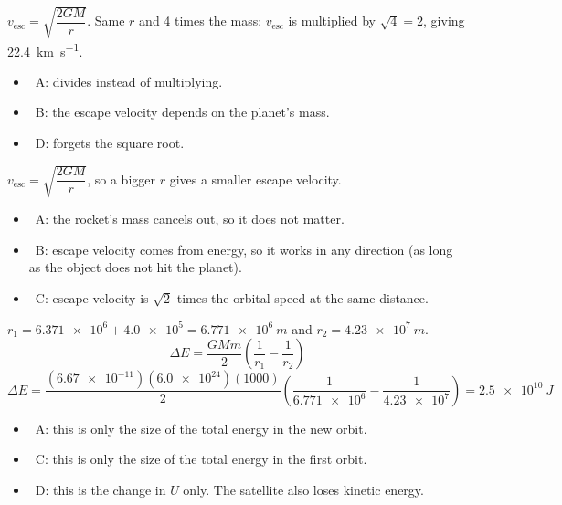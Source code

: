 \documentclass[12pt]{article}
\begin{document}
\begin{practiceanswers}
\begin{practiceans}
  $v_\mathrm{esc} = \sqrt{\dfrac{2GM}{r}}$. Same $r$ and 4 times the mass: $v_\mathrm{esc}$ is
  multiplied by $\sqrt{4} = 2$, giving \qty{22.4}{km.s^{-1}}.
  \begin{itemize}
    \item \xmark\ A: divides instead of multiplying.
    \item \xmark\ B: the escape velocity depends on the planet's mass.
    \item \xmark\ D: forgets the square root.
  \end{itemize}
\end{practiceans}

\begin{practiceans}
  $v_\mathrm{esc} = \sqrt{\dfrac{2GM}{r}}$, so a bigger $r$ gives a smaller escape velocity.
  \begin{itemize}
    \item \xmark\ A: the rocket's mass cancels out, so it does not matter.
    \item \xmark\ B: escape velocity comes from energy, so it works in any direction (as long as the
          object does not hit the planet).
    \item \xmark\ C: escape velocity is $\sqrt{2}$ times the orbital speed at the same distance.
  \end{itemize}
\end{practiceans}

\begin{practiceans}
  $r_1 = \num{6.371e6} + \num{4.0e5} = \qty{6.771e6}{m}$ and $r_2 = \qty{4.23e7}{m}$.
  \[ \Delta E = \frac{GMm}{2}\left(\frac{1}{r_1} - \frac{1}{r_2}\right) \]
  \[ \Delta E = \frac{(\num{6.67e-11})(\num{6.0e24})(1000)}{2}\left(\frac{1}{\num{6.771e6}} - \frac{1}{\num{4.23e7}}\right)
     = \qty{2.5e10}{J} \]
  \begin{itemize}
    \item \xmark\ A: this is only the size of the total energy in the new orbit.
    \item \xmark\ C: this is only the size of the total energy in the first orbit.
    \item \xmark\ D: this is the change in $U$ only. The satellite also loses kinetic energy.
  \end{itemize}
\end{practiceans}


\end{practiceanswers}
\end{document}

